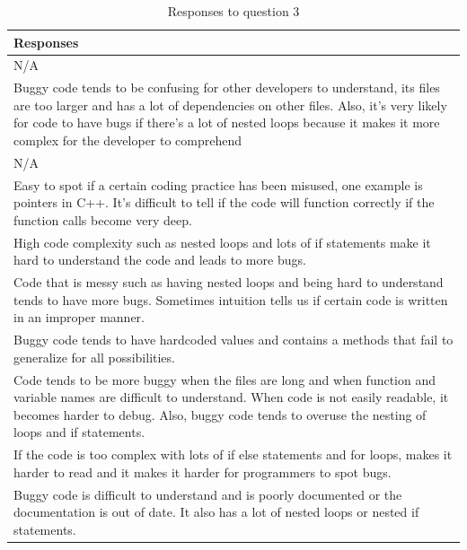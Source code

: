 \documentclass[../main.tex]{subfiles}
\begin{document}
\begin{table}[H]
\centering
    \begin{tabular}{|p{15cm}|}
        \hline
        \textbf{Responses}\\ 
        \hline\hline
        N/A\\
        \hline
        Buggy code tends to be confusing for other developers to understand, its files are too larger and has a lot of dependencies on other files. Also, it's very likely for code to have bugs if there's a lot of nested loops because it makes it more complex for the developer to comprehend\\
        \hline
        N/A\\
        \hline
        Easy to spot if a certain coding practice has been misused, one example is pointers in C++. It's difficult to tell if the code will function correctly if the function calls become very deep.\\
        \hline
        High code complexity such as nested loops and lots of if statements make it hard to understand the code and leads to more bugs.\\
        \hline
        Code that is messy such as having nested loops and being hard to understand tends to have more bugs. Sometimes intuition tells us if certain code is written in an improper manner. \\
        \hline
        Buggy code tends to have hardcoded values and contains a methods that fail to generalize for all possibilities. \\
        \hline
        Code tends to be more buggy when the files are long and when function and variable names are difficult to understand. When code is not easily readable, it becomes harder to debug. Also, buggy code tends to overuse the nesting of loops and if statements.\\
        \hline
        If the code is too complex with lots of if else statements and for loops, makes it harder to read and it makes it harder for programmers to spot bugs. \\
        \hline
        Buggy code is difficult to understand and is poorly documented or the documentation is out of date. It also has a lot of nested loops or nested if statements.\\
        \hline
    \end{tabular}
\caption{Responses to question 3}
\label{table:rq2Table3}
\end{table}
\end{document}
